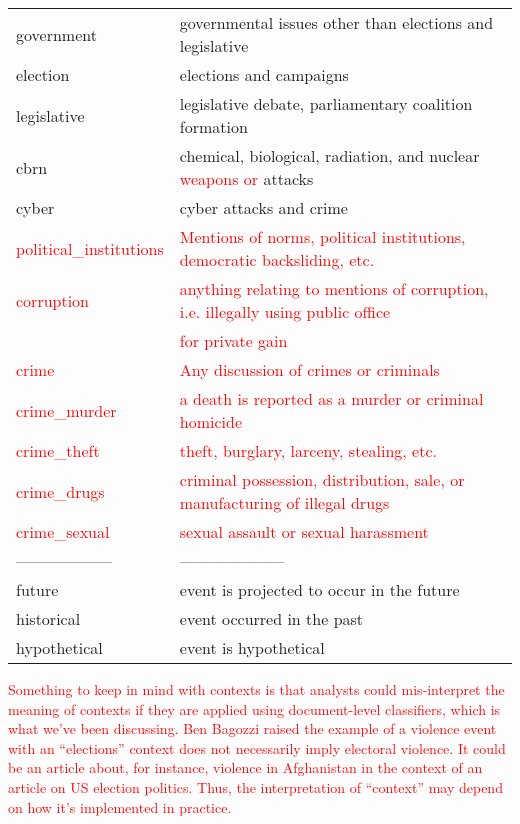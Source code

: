\documentclass[11pt]{report}
\newcommand{\andy}[1]{\textcolor{red}{#1}}
\begin{document}
\begin{table}[htp]
\begin{center}
\begin{tabular}{|l|l|}
government & governmental issues other than elections and legislative \\
election & elections and campaigns \\
legislative & legislative debate, parliamentary coalition formation \\
cbrn & chemical, biological, radiation, and nuclear \andy{weapons or} attacks  \\
cyber & cyber attacks and crime\\
\andy{political\_institutions} & \andy{Mentions of norms, political institutions, democratic backsliding, etc.} \\
\andy{corruption} & \andy{anything relating to mentions of corruption, i.e. illegally using public office} \\
&\hspace{6pt} \andy{for private gain} \\
\andy{crime} & \andy{Any discussion of crimes or criminals} \\
\andy{crime\_murder} & \andy{a death is reported as a murder or criminal homicide} \\
\andy{crime\_theft} & \andy{theft, burglary, larceny, stealing, etc.} \\
\andy{crime\_drugs} & \andy{criminal possession, distribution, sale, or manufacturing of illegal drugs} \\
\andy{crime\_sexual} & \andy{sexual assault or sexual harassment} \\
------------------ & -------------------- \\
future & event is projected to occur in the future\\
historical & event occurred in the past\\
hypothetical & event is hypothetical\\
\hline
\end{tabular}
\end{center}
\label{tab:context}
\end{table}

\andy{Something to keep in mind with contexts is that analysts could mis-interpret the meaning of contexts if they are applied using document-level classifiers, which is what we've been discussing. Ben Bagozzi raised the example of a violence event with an ``elections'' context does not necessarily imply electoral violence. It could be an article about, for instance, violence in Afghanistan in the context of an article on US election politics. Thus, the interpretation of ``context'' may depend on how it's implemented in practice.}
\end{document}
